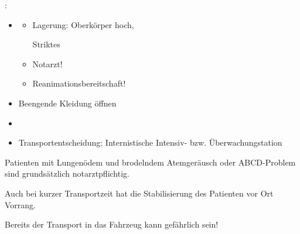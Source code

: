 
\label{m:lungenoedem-schwer}
: 

\begin{itemize}
  \item \TxMassVitMK
  \begin{itemize}
    \item Lagerung: Oberkörper hoch, 

    Striktes 
    \item  Notarzt!
    \item Reanimationsbereitschaft!
  \end{itemize}
  \item Beengende Kleidung öffnen
  \item {}
  \item Transportentscheidung: Internistische Intensiv- bzw. Überwachungstation
\end{itemize}

\begin{Danger}
  \item Patienten mit Lungenödem und brodelndem Atemgeräusch oder ABCD-Problem 
  sind grundsätzlich notarztpflichtig. 
  
  Auch bei kurzer Transportzeit hat die Stabilisierung des Patienten vor Ort Vorrang.
  
  Bereits der Transport in das Fahrzeug kann gefährlich sein!
\end{Danger}


